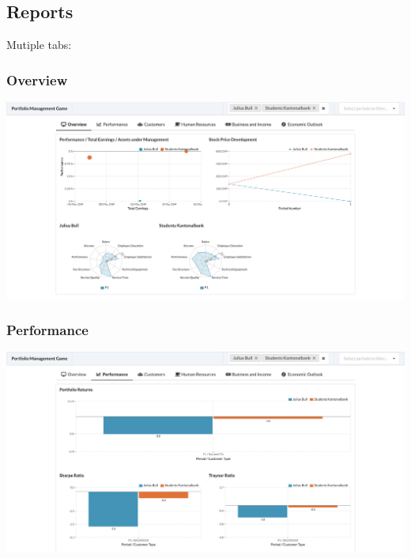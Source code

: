 \subsection{Reports}
Mutiple tabs:

\subsubsection{Overview}
\begin{center}
  \includegraphics[scale=0.2]{img/application-overview/reports/01_overview.png}
\end{center}

\subsubsection{Performance}
\begin{center}
  \includegraphics[scale=0.2]{img/application-overview/reports/02_performance.png}
\end{center}

